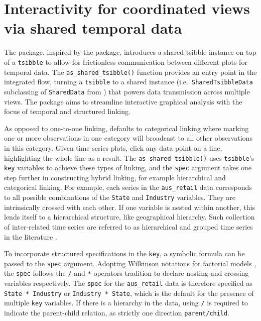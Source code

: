 \hypertarget{interactivity-for-coordinated-views-via-shared-temporal-data}{%
\section{Interactivity for coordinated views via shared temporal
data}\label{interactivity-for-coordinated-views-via-shared-temporal-data}}

The  package, inspired by the 
package, introduces a shared tsibble instance on top of a
\texttt{tsibble} to allow for frictionless communication between
different plots for temporal data. The \texttt{as\_shared\_tsibble()}
function provides an entry point in the integrated flow, turning a
\texttt{tsibble} to a shared instance (i.e.~\texttt{SharedTsibbleData}
subclassing of \texttt{SharedData} from ) that powers
data transmission across multiple views. The 
package aims to streamline interactive graphical analysis with the focus
of temporal and structured linking.

As opposed to one-to-one linking,  defaults to
categorical linking where marking one or more observations in one
category will broadcast to all other observations in this category.
Given time series plots, click any data point on a line, highlighting
the whole line as a result. The \texttt{as\_shared\_tsibble()} uses
\texttt{tsibble}'s \texttt{key} variables to achieve these types of
linking, and the \texttt{spec} argument takes one step further in
constructing hybrid linking, for example hierarchical and categorical
linking. For example, each series in the \texttt{aus\_retail} data
corresponds to all possible combinations of the \texttt{State} and
\texttt{Industry} variables. They are intrinsically crossed with each
other. If one variable is nested within another, this lends itself to a
hierarchical structure, like geographical hierarchy. Such collection of
inter-related time series are referred to as hierarchical and grouped
time series in the literature \citep{fpp}.

To incorporate structured specifications in the \texttt{key}, a symbolic
formula can be passed to the \texttt{spec} argument. Adopting Wilkinson
notations for factorial models \citep{Wilkinson1973}, the \texttt{spec}
follows the \texttt{/} and \texttt{*} operators tradition to declare
nesting and crossing variables respectively. The \texttt{spec} for the
\texttt{aus\_retail} data is therefore specified as
\texttt{State\ *\ Industry} or \texttt{Industry\ *\ State}, which is the
default for the presence of multiple \texttt{key} variables. If there is
a hierarchy in the data, using \texttt{/} is required to indicate the
parent-child relation, as strictly one direction \texttt{parent/child}.

